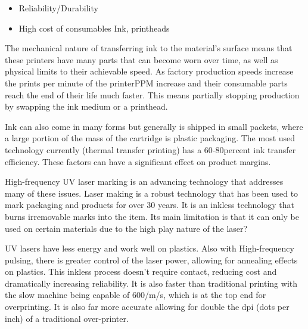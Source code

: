 \begin{itemize}
    \item Reliability/Durability
    \item High cost of consumables Ink, printheads
\end{itemize}

The mechanical nature of transferring ink to the material's surface means that these printers have many parts that can become worn over time, as well as physical limits to their achievable speed. As factory production speeds increase the prints per minute of the printerPPM increase and their consumable parts reach the end of their life much faster. This means partially stopping production by swapping the ink medium or a printhead.

\bigskip
Ink can also come in many forms but generally is shipped in small packets, where a large portion of the mass of the cartridge is plastic packaging. The most used technology currently (thermal transfer printing) has a 60-80percent ink transfer efficiency. These factors can have a significant effect on product margins. 

\bigskip
High-frequency UV laser marking is an advancing technology that addresses many of these issues. Laser making is a robust technology that has been used to mark packaging and products for over 30 years. It is an inkless technology that burns irremovable marks into the item. Its main limitation is that it can only be used on certain materials due to the high play nature of the laser?

\bigskip
UV lasers have less energy and work well on plastics. Also with High-frequency pulsing, there is greater control of the laser power, allowing for annealing effects on plastics. This inkless process doesn't require contact, reducing cost and dramatically increasing reliability. It is also faster than traditional printing with the slow machine being capable of 600/m/s, which is at the top end for overprinting. It is also far more accurate allowing for double the dpi (dots per inch) of a traditional over-printer. 










